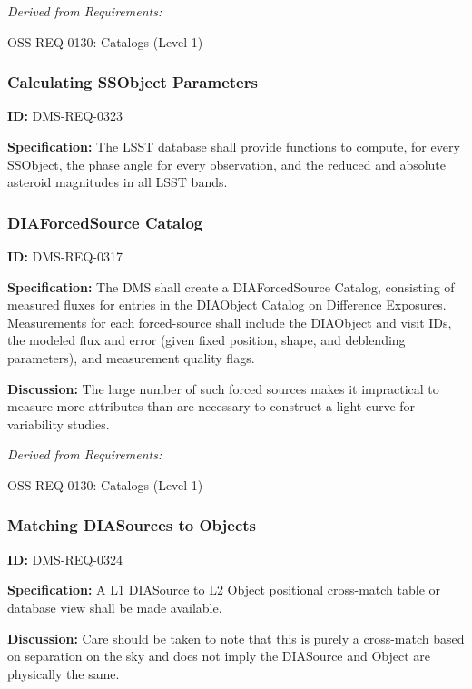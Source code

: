 \documentclass[SE,toc,lsstdraft]{lsstdoc}
\begin{document}
\emph{Derived from Requirements:}

OSS-REQ-0130:
Catalogs (Level 1) \newline


\subsubsection{Calculating SSObject Parameters}

\label{DMS-REQ-0323}
\textbf{ID:} DMS-REQ-0323

\textbf{Specification:} The LSST database shall provide functions to compute, for every SSObject, the phase angle for every observation, and the reduced and absolute asteroid magnitudes in all LSST bands.






\subsubsection{DIAForcedSource Catalog}

\label{DMS-REQ-0317}
\textbf{ID:} DMS-REQ-0317

\textbf{Specification:} The DMS shall create a DIAForcedSource Catalog, consisting of measured fluxes for entries in the DIAObject Catalog on Difference Exposures. Measurements for each forced-source shall include the DIAObject and visit IDs, the modeled flux and error (given fixed position, shape, and deblending parameters), and measurement quality flags.

\textbf{Discussion: }The large number of such forced sources makes it impractical to measure more attributes than are necessary to construct a light curve for variability studies.




\emph{Derived from Requirements:}

OSS-REQ-0130:
Catalogs (Level 1) \newline


\subsubsection{Matching DIASources to Objects}

\label{DMS-REQ-0324}
\textbf{ID:} DMS-REQ-0324

\textbf{Specification:} A L1 DIASource to L2 Object positional cross-match table or database view shall be made available.

\textbf{Discussion:} Care should be taken to note that this is purely a cross-match based on separation on the sky and does not imply the DIASource and Object are physically the same.
\end{document}
